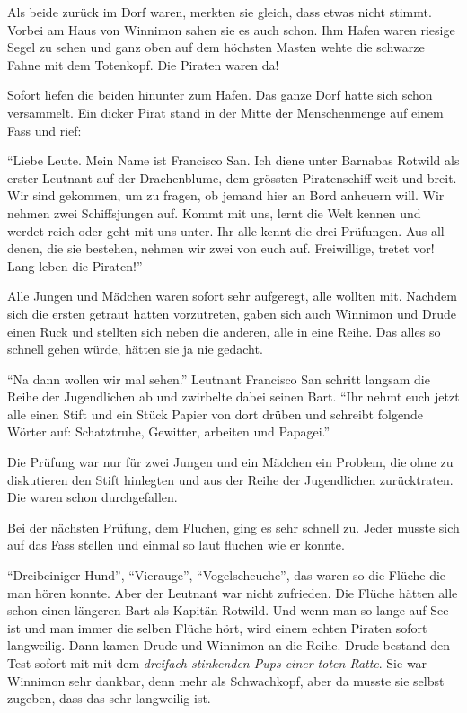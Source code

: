 Als beide zurück im Dorf waren, merkten sie gleich, dass etwas nicht stimmt. Vorbei am Haus von Winnimon sahen sie es auch schon. Ihm Hafen waren riesige Segel zu sehen und ganz oben auf dem höchsten Masten wehte die schwarze Fahne mit dem Totenkopf. Die Piraten waren da!

Sofort liefen die beiden hinunter zum Hafen. Das ganze Dorf hatte sich schon versammelt. Ein dicker Pirat stand in der Mitte der Menschenmenge auf einem Fass und rief:

\enquote{Liebe Leute. Mein Name ist Francisco San. Ich diene unter Barnabas Rotwild als erster Leutnant auf der Drachenblume, dem grössten Piratenschiff weit und breit. Wir sind gekommen, um zu fragen, ob jemand hier an Bord anheuern will. Wir nehmen zwei Schiffsjungen auf. Kommt mit uns, lernt die Welt kennen und werdet reich oder geht mit uns unter. Ihr alle kennt die drei Prüfungen. Aus all denen, die sie bestehen, nehmen wir zwei von euch auf. Freiwillige, tretet vor! Lang leben die Piraten!}

Alle Jungen und Mädchen waren sofort sehr aufgeregt, alle wollten mit. Nachdem sich die ersten getraut hatten vorzutreten, gaben sich auch Winnimon und Drude einen Ruck und stellten sich neben die anderen, alle in eine Reihe. Das alles so schnell gehen würde, hätten sie ja nie gedacht.

\enquote{Na dann wollen wir mal sehen.} Leutnant Francisco San schritt langsam die Reihe der Jugendlichen ab und zwirbelte dabei seinen Bart. \enquote{Ihr nehmt euch jetzt alle einen Stift und ein Stück Papier von dort drüben und schreibt folgende Wörter auf: Schatztruhe, Gewitter, arbeiten und Papagei.}

Die Prüfung war nur für zwei Jungen und ein Mädchen ein Problem, die ohne zu diskutieren den Stift hinlegten und aus der Reihe der Jugendlichen zurücktraten. Die waren schon durchgefallen. 

Bei der nächsten Prüfung, dem Fluchen, ging es sehr schnell zu. Jeder musste sich auf das Fass stellen und einmal so laut fluchen wie er konnte. 

\enquote{Dreibeiniger Hund}, \enquote{Vierauge}, \enquote{Vogelscheuche}, das waren so die Flüche die man hören konnte. Aber der Leutnant war nicht zufrieden. Die Flüche hätten alle schon einen längeren Bart als Kapitän Rotwild. Und wenn man so lange auf See ist und man immer die selben Flüche hört, wird einem echten Piraten sofort langweilig. Dann kamen Drude und Winnimon an die Reihe. Drude bestand den Test sofort mit mit dem {\it dreifach stinkenden Pups einer toten Ratte}. Sie war Winnimon sehr dankbar, denn mehr als Schwachkopf, aber da musste sie selbst zugeben, dass das sehr langweilig ist.

